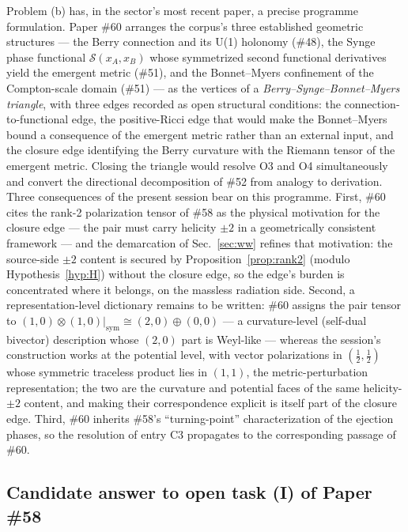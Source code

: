 \documentclass[%
 reprint, amsmath,amssymb, aps, prb, ]{revtex4-2}
\numberwithin{equation}{section}
\begin{document}
Problem (b) has, in the sector's most recent paper, a precise programme formulation. Paper \#60 \cite{hanamura60} arranges the corpus's three established geometric structures --- the Berry connection and its U(1) holonomy (\#48), the Synge phase functional $\mathcal{S}(x_A,x_B)$ whose symmetrized second functional derivatives yield the emergent metric (\#51), and the Bonnet--Myers confinement of the Compton-scale domain (\#51) --- as the vertices of a \emph{Berry--Synge--Bonnet--Myers triangle}, with three edges recorded as open structural conditions: the connection-to-functional edge, the positive-Ricci edge that would make the Bonnet--Myers bound a consequence of the emergent metric rather than an external input, and the closure edge identifying the Berry curvature with the Riemann tensor of the emergent metric. Closing the triangle would resolve O3 and O4 simultaneously and convert the directional decomposition of \#52 from analogy to derivation. Three consequences of the present session bear on this programme. First, \#60 cites the rank-2 polarization tensor of \#58 as the physical motivation for the closure edge --- the pair must carry helicity $\pm2$ in a geometrically consistent framework --- and the demarcation of Sec.~\ref{sec:ww} refines that motivation: the source-side $\pm2$ content is secured by Proposition~\ref{prop:rank2} (modulo Hypothesis~\ref{hyp:H}) without the closure edge, so the edge's burden is concentrated where it belongs, on the massless radiation side. Second, a representation-level dictionary remains to be written: \#60 assigns the pair tensor to $(1,0)\otimes(1,0)|_{\mathrm{sym}}\cong(2,0)\oplus(0,0)$ --- a curvature-level (self-dual bivector) description whose $(2,0)$ part is Weyl-like --- whereas the session's construction works at the potential level, with vector polarizations in $(\tfrac{1}{2},\tfrac{1}{2})$ whose symmetric traceless product lies in $(1,1)$, the metric-perturbation representation; the two are the curvature and potential faces of the same helicity-$\pm2$ content, and making their correspondence explicit is itself part of the closure edge. Third, \#60 inherits \#58's ``turning-point'' characterization of the ejection phases, so the resolution of entry C3 propagates to the corresponding passage of \#60.

\subsection{Candidate answer to open task (I) of Paper \#58}
\label{sec:taskI}
\end{document}
